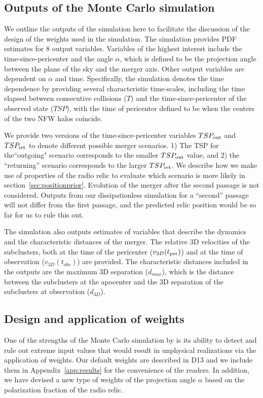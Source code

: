 \documentclass[letterpaper,useAMS,usenatbib]{mn2e}
\begin{document}
\subsection{Outputs of the Monte Carlo simulation}\label{sec:outputs}
We outline the outputs of the simulation here to facilitate the discussion
of the design of the weights used in the simulation. The simulation
provides PDF estimates for 8 output variables. Variables
of the highest interest include the time-since-pericenter and the angle $\alpha$, which is
defined to be the projection angle between the plane of the sky and the
merger axis. Other output variables are dependent on $\alpha$ and time. Specifically, the simulation denotes the time dependence by
providing several characteristic time-scales, including the time
elapsed between consecutive collisions
($T$) and the time-since-pericenter of the observed state ($TSP$), with the
time of pericenter defined to be when the centers of the two NFW halos coincide. 
\par
We provide two versions of the time-since-pericenter variables $TSP_{\rm out}$ and
$TSP_{\rm ret}$ to denote different possible merger scenarios. 
1) The TSP for the``outgoing" scenario corresponds to the
smaller $TSP_{\rm out}$ value, and 2) the ``returning'' scenario 
corresponds to the larger $TSP_{\rm ret}$.
We describe how we make use of properties of the radio relic to evaluate
which scenario is more likely in
section~\ref{sec:positionprior}. Evolution of the merger after the second
passage is not considered. Outputs from our dissipationless simulation for
a ``second'' passage will not differ from the first passage, and the
predicted relic position would be so far for us to rule this out.
 
The simulation also outputs estimates of variables that describe
the dynamics and the characteristic distances of the merger. The relative
3D velocities of the subclusters, both at the time of the
pericenter ($v_{3D}(t_{\rm per})$) and at the time of observation
($v_{3D}(t_{obs})$) are provided. The characteristic
distances included in the outputs are the maximum 3D separation ($d_{max}$),
which is the distance between the subclusters at
the apocenter and the 3D separation of the subclusters at observation
($d_{3D}$). 
\subsection{Design and application of weights} 
\label{sec:priors}
One of the strengths of the Monte Carlo simulation by
 is its ability to detect and rule out extreme input values that would result in
unphysical realizations via the application of weights. 
Our default weights are described in D13 and we include them in
Appendix~\ref{app:results} for the convenience of the readers. 
In addition, we have devised a new type of weights of the projection angle $\alpha$
based on the polarization fraction of the radio relic.
\end{document}
